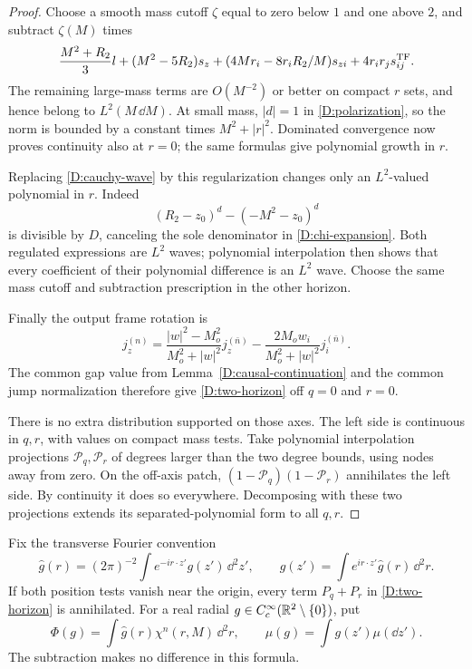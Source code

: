 \begin{proof}
Choose a smooth mass cutoff $\zeta$ equal to zero below $1$ and
one above $2$, and subtract $\zeta(M)$ times
\[
 \frac{M^2+R_2}{3}l+(M^2-5R_2)s_z
 +(4Mr_i-8r_iR_2/M)s_{zi}+4r_ir_js_{ij}^{\rm TF}.
\]
The remaining large-mass terms are $O(M^{-2})$ or better on
compact $r$ sets, and hence belong to $L^2(M\,\dd M)$.
At small mass, $|d|=1$ in \eqref{D:polarization}, so the norm is
bounded by a constant times $M^2+|r|^2$.  Dominated convergence
now proves continuity also at $r=0$; the same formulas give
polynomial growth in $r$.

Replacing \eqref{D:cauchy-wave} by this regularization changes
only an $L^2$-valued polynomial in $r$.  Indeed
\[
 (R_2-z_0)^d-(-M^2-z_0)^d
\]
is divisible by $D$, canceling the sole denominator in
\eqref{D:chi-expansion}.  Both regulated expressions are $L^2$
waves; polynomial interpolation then shows that every coefficient
of their polynomial difference is an $L^2$ wave.  Choose the same
mass cutoff and subtraction prescription in the other horizon.

Finally the output frame rotation is
\[
 j_z^{(n)}=\frac{|w|^2-M_o^2}{M_o^2+|w|^2}j_z^{(\bar n)}
 -\frac{2M_ow_i}{M_o^2+|w|^2}j_i^{(\bar n)}.
\]
The common gap value from Lemma~\ref{D:causal-continuation} and the
common jump normalization therefore give \eqref{D:two-horizon}
off $q=0$ and $r=0$.

There is no extra distribution supported on those axes.  The left
side is continuous in $q,r$, with values on compact mass tests.
Take polynomial interpolation projections $\mathcal P_q,
\mathcal P_r$ of degrees larger than the two degree bounds, using
nodes away from zero.  On the off-axis patch,
$(1-\mathcal P_q)(1-\mathcal P_r)$ annihilates the left side.
By continuity it does so everywhere.  Decomposing with these two
projections extends its separated-polynomial form to all $q,r$.
\end{proof}

Fix the transverse Fourier convention
\[
 \widehat g(r)=(2\pi)^{-2}\int e^{-ir\cdot z'}g(z')\,\dd^2z',
 \qquad g(z')=\int e^{ir\cdot z'}\widehat g(r)\,\dd^2r.
\]
If both position tests vanish near the origin, every term $P_q+P_r$
in \eqref{D:two-horizon} is annihilated.  For a real radial
$g\in C_c^\infty(\mathbb R^2\setminus\{0\})$, put
\begin{equation}\label{D:Phi}
 \Phi(g)=\int\widehat g(r)\chi^n(r,M)\,\dd^2r,
 \qquad \mu(g)=\int g(z')\mu(\dd z').
\end{equation}
The subtraction makes no difference in this formula.

